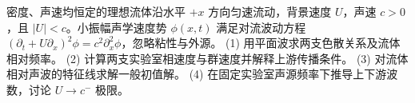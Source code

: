密度、声速均恒定的理想流体沿水平 \(+x\) 方向匀速流动，背景速度 \(U\)，声速 \(c>0\)，且 \(|U|<c\)。小振幅声学速度势 \(\phi(x,t)\) 满足对流波动方程 \((\partial_t+U\partial_x)^2\phi=c^2\partial_x^2\phi\)，忽略粘性与外源。
(1) 用平面波求两支色散关系及流体相对频率。
(2) 计算两支实验室相速度与群速度并解释上游传播条件。
(3) 对流体相对声波的特征线求解一般初值解。
(4) 在固定实验室声源频率下推导上下游波数，讨论 \(U\to c^-\) 极限。
